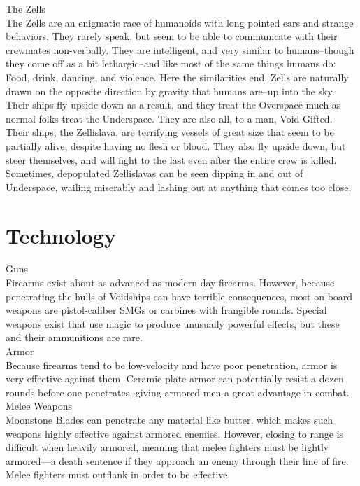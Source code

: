 \documentclass[a4paper, twocolumn, openany]{book}
\begin{document}
{	{\large The Zells\\}
	The Zells are an enigmatic race of humanoids with long pointed ears and strange behaviors.
	They rarely speak, but seem to be able to communicate with their crewmates non-verbally. They
	are intelligent, and very similar to humans--though they come off as a bit lethargic--and like most
	of the same things humans do: Food, drink, dancing, and violence. Here the similarities end.
	Zells are naturally drawn on the opposite direction by gravity that humans are--up into the sky.
	Their ships fly upside-down as a result, and they treat the Overspace much as normal folks treat
	the Underspace. They are also all, to a man, Void-Gifted. Their ships, the Zellislava, are
	terrifying vessels of great size that seem to be partially alive, despite having no flesh or blood.
	They also fly upside down, but steer themselves, and will fight to the last even after the entire
	crew is killed. Sometimes, depopulated Zellislavas can be seen dipping in and out of
	Underspace, wailing miserably and lashing out at anything that comes too close.\\

\newpage
\section{Technology}

	{\large Guns\\}
	Firearms exist about as advanced as modern day firearms. However, because penetrating the
	hulls of Voidships can have terrible consequences, most on-board weapons are pistol-caliber
	SMGs or carbines with frangible rounds.
	Special weapons exist that use magic to produce unusually powerful effects, but these and their
	ammunitions are rare.\\

	{\large Armor\\}
	Because firearms tend to be low-velocity and have poor penetration, armor is very effective
	against them. Ceramic plate armor can potentially resist a dozen rounds before one penetrates,
	giving armored men a great advantage in combat.\\

	{\large Melee Weapons\\}
	Moonstone Blades can penetrate any material like butter, which makes such weapons highly
	effective against armored enemies. However, closing to range is difficult when heavily armored,
	meaning that melee fighters must be lightly armored—a death sentence if they approach an
	enemy through their line of fire. Melee fighters must outflank in order to be effective.\\%

}
\end{document}
